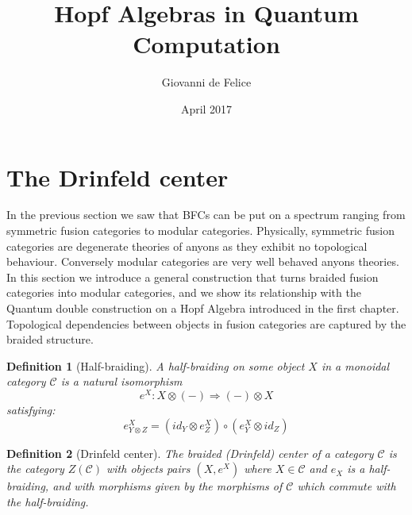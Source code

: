 \documentclass{article}
\title{Hopf Algebras in Quantum Computation}
\author{Giovanni de Felice}
\date{April 2017}
\newtheorem{definition}{Definition}
\newcommand{\cat}{\mathcal{C}}
\begin{document}
\section{The Drinfeld center}
In the previous section we saw that BFCs can be put on a spectrum ranging from symmetric fusion categories to modular categories. Physically, symmetric fusion categories are degenerate theories of anyons as they exhibit no topological behaviour. Conversely modular categories are very well behaved anyons theories.  In this section we introduce a general construction that turns braided fusion categories into modular categories, and we show its relationship with the Quantum double construction on a Hopf Algebra introduced in the first chapter.\\
Topological dependencies between objects in fusion categories are captured by the braided structure.
\begin{definition}[Half-braiding]
	A half-braiding on some object $X$ in a monoidal category $\cat$ is a natural isomorphism 
	$$ e^X : X \otimes (-) \Rightarrow (-) \otimes X$$
	satisfying: 
	$$e^X_{Y \otimes Z} =(id_Y \otimes e^X_Z) \circ (e^X_Y \otimes id_Z)$$ 
\end{definition}
\begin{definition}[Drinfeld center]
	The braided (Drinfeld) center of a category $\mathcal{C}$ is the category $Z(\mathcal{C})$ with objects pairs $(X,e^X)$ where $X \in \mathcal{C}$ and $e_X$ is a half-braiding, and with morphisms given by the morphisms of $\mathcal{C}$ which commute with the half-braiding.
\end{definition}
\end{document}
